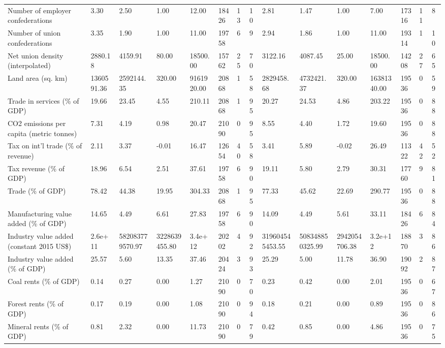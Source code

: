 \begin{longtable}{lllllllllllllll}
\addlinespace
Number of employer confederations & 3.30 & 2.50 & 1.00 & 12.00 & 18426 & 13 & 10 & 2.81 & 1.47 & 1.00 & 7.00 & 17316 & 11 & 8\\
Number of union confederations & 3.35 & 1.90 & 1.00 & 11.00 & 19758 & 6 & 9 & 2.94 & 1.86 & 1.00 & 11.00 & 19314 & 1 & 10\\
Net union density (interpolated) & 2880.18 & 4159.91 & 80.00 & 18500.00 & 15762 & 25 & 70 & 3122.16 & 4087.45 & 25.00 & 18500.00 & 14208 & 27 & 65\\
Land area (sq. km) & 1360591.36 & 2592144.35 & 320.00 & 9161920.00 & 20868 & 1 & 58 & 2829458.68 & 4732421.37 & 320.00 & 16381340.00 & 19536 & 0 & 59\\
Trade in services (\% of GDP) & 19.66 & 23.45 & 4.55 & 210.11 & 20868 & 1 & 95 & 20.27 & 24.53 & 4.86 & 203.22 & 19536 & 0 & 88\\
\addlinespace
CO2 emissions per capita (metric tonnes) & 7.31 & 4.19 & 0.98 & 20.47 & 21090 & 0 & 95 & 8.55 & 4.40 & 1.72 & 19.60 & 19536 & 0 & 88\\
Tax on int'l trade (\% of revenue) & 2.11 & 3.37 & -0.01 & 16.47 & 12654 & 40 & 58 & 3.41 & 5.89 & -0.02 & 26.49 & 11322 & 42 & 52\\
Tax revenue (\% of GDP) & 18.96 & 6.54 & 2.51 & 37.61 & 19758 & 6 & 90 & 19.11 & 5.80 & 2.79 & 30.31 & 17760 & 9 & 81\\
Trade (\% of GDP) & 78.42 & 44.38 & 19.95 & 304.33 & 20868 & 1 & 95 & 77.33 & 45.62 & 22.69 & 290.77 & 19536 & 0 & 88\\
Manufacturing value added (\% of GDP) & 14.65 & 4.49 & 6.61 & 27.83 & 19758 & 6 & 90 & 14.09 & 4.49 & 5.61 & 33.11 & 18426 & 6 & 84\\
\addlinespace
Industry value added (constant 2015 US\$) & 2.6e+11 & 582083779570.97 & 3228639455.80 & 3.4e+12 & 20202 & 4 & 92 & 319604545453.55 & 508348850325.99 & 2942054706.38 & 3.2e+12 & 18870 & 3 & 86\\
Industry value added (\% of GDP) & 25.57 & 5.60 & 13.35 & 37.46 & 20424 & 3 & 93 & 25.29 & 5.00 & 11.78 & 36.90 & 19092 & 2 & 87\\
Coal rents (\% of GDP) & 0.14 & 0.27 & 0.00 & 1.27 & 21090 & 0 & 70 & 0.23 & 0.42 & 0.00 & 2.01 & 19536 & 0 & 67\\
Forest rents (\% of GDP) & 0.17 & 0.19 & 0.00 & 1.08 & 21090 & 0 & 94 & 0.18 & 0.21 & 0.00 & 0.89 & 19536 & 0 & 86\\
Mineral rents (\% of GDP) & 0.81 & 2.32 & 0.00 & 11.73 & 21090 & 0 & 79 & 0.42 & 0.85 & 0.00 & 4.86 & 19536 & 0 & 75\\

\end{longtable}
